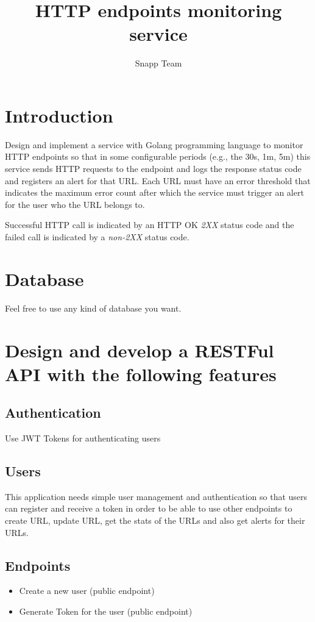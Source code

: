 \documentclass{article}
\begin{document}
\title{HTTP endpoints monitoring service}
\author{Snapp Team}

\maketitle
\tableofcontents

\section{Introduction}
Design and implement a service with Golang programming language to monitor HTTP endpoints so that in some configurable periods (e.g., the 30s, 1m, 5m) this service sends HTTP requests to the endpoint and logs the response status code and registers an alert for that URL. Each URL must have an error threshold that indicates the maximum error count after which the service must trigger an alert for the user who the URL belongs to.

Successful HTTP call is indicated by an HTTP OK \textit{2XX} status code and the failed call is indicated by a \textit{non-2XX} status code.

\section{Database}

Feel free to use any kind of database you want.

\section{Design and develop a RESTFul API with the following features}
\subsection{Authentication}
Use JWT Tokens for authenticating users

\subsection{Users}
This application needs simple user management and authentication so that users can register and receive a token in order to be able to use other endpoints to create URL, update URL, get the stats of the URLs and also get alerts for their URLs.

\subsection{Endpoints}
\begin{itemize}
  \item Create a new user (public endpoint)
  \item Generate Token for the user (public endpoint)
\end{itemize}
\end{document}
